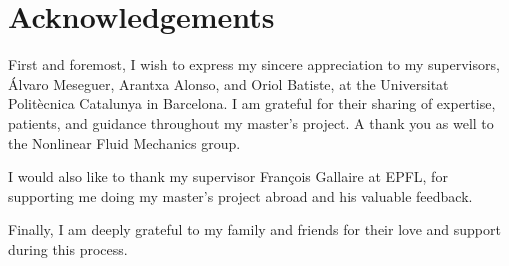 
\section*{Acknowledgements}

First and foremost, I wish to express my sincere appreciation to my
supervisors, Álvaro Meseguer, Arantxa Alonso, and Oriol Batiste, at the
Universitat Politècnica Catalunya in Barcelona. I am grateful for their sharing
of expertise, patients, and guidance throughout my master's project. A thank
you as well to the Nonlinear Fluid Mechanics group.

I would also like to thank my supervisor François Gallaire at EPFL, for
supporting me doing my master's project abroad and his valuable feedback.

Finally, I am deeply grateful to my family and friends for their love and
support during this process.
